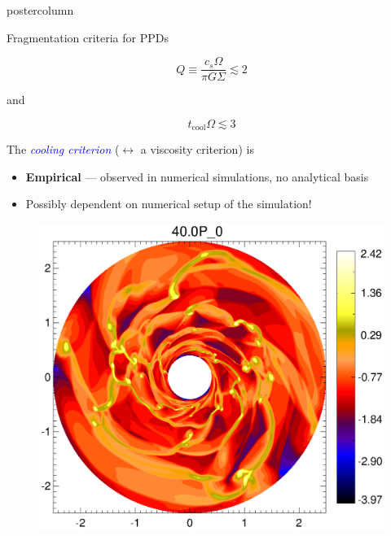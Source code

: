 \documentclass[final,hyperref={pdfpagelabels=false}]{beamer}
\begin{document}
\begin{frame}
\begin{columns}
\begin{column}{.49\textwidth}
\begin{beamercolorbox}[center,wd=\textwidth]{postercolumn}
\begin{minipage}[T]{.95\textwidth}
{            
            \begin{block}{{\Large Fragmentation criteria for PPDs}}
              \justifying
              \begin{center}
                \begin{onlinebox}{6.5cm}
                  \[ Q\equiv\frac{c_s\Omega}{\pi G \Sigma}\lesssim 2\] 
                \end{onlinebox}
                and
                \begin{onlinebox}{4.5cm}
                  \[t_\mathrm{cool}\Omega\lesssim 3\]
                \end{onlinebox}
              \end{center}
              The \textcolor{blue}{\it cooling criterion} ($\leftrightarrow$ a viscosity criterion) is   
              \begin{itemize}
              \item {\bf Empirical} --- observed in numerical
                simulations,  no analytical basis
              \item Possibly dependent on numerical setup of the simulation!
              \end{itemize}
              \vspace{-0.237cm}
              \begin{figure}
                \includegraphics[width=\linewidth,clip=true,trim=0cm 0cm 0cm 0.6cm]{figures/disk_frag1}
              \end{figure}
              \vspace{-1cm}


\end{block}}
\end{minipage}
\end{beamercolorbox}
\end{column}
\end{columns}
\end{frame}
\end{document}
